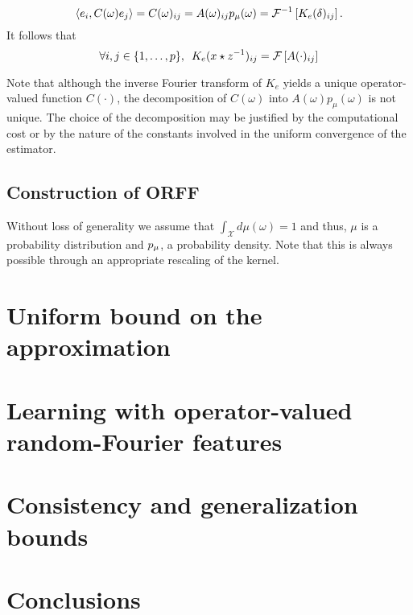\begin{equation}
\label{eq:operator_identification_real}\langle e_i,C(\omega)e_j\rangle=C(\omega)_{ij}=A(\omega)_{ij}p_{\mu}(\omega)=\mathcal{F}^{-1}\left[K_e(\delta)_{ij}\right].
\end{equation}
It follows that
\begin{equation}\label{eq:matrix-exp}
\forall i,j \in {\left\{1, \ldots, p\right\}}, \enskip K_e(x\star {z}^{-1})_{ij}= \mathcal{F}\left[A(\cdot)_{ij}\right]
\end{equation}

\begin{remark}
Note that although the inverse Fourier transform of $K_e$ yields a unique operator-valued function $C(\cdot)$, the decomposition of $C(\omega)$ into $A(\omega)p_\mu(\omega)$ is not unique. The choice of the decomposition may be justified by the computational cost or by the nature of the constants involved in the uniform convergence of the estimator.
\end{remark}

\subsection{Construction of ORFF}
Without loss of generality we assume that $\int_{\mathcal{X}} d\mu(\omega)=1$ and thus, $\mu$ is a probability distribution and $p_{\mu}$, a probability density. Note that this is always possible through an appropriate rescaling of the kernel. 

\section{Uniform bound on the approximation}
\label{sec:uniform_bound_on_the_approximation}

\section{Learning with operator-valued random-Fourier features}
\label{sec:learning_with_operator-valued_random-fourier_features}

\section{Consistency and generalization bounds}
\label{sec:consistency and generalization bounds}

\section{Conclusions}
\label{sec:conclusions}
